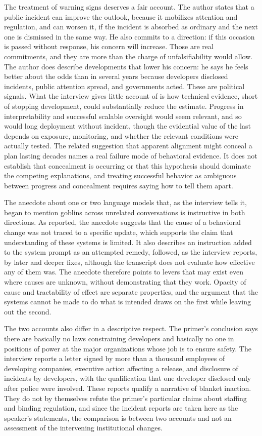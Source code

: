 \documentclass[11pt]{article}
\begin{document}
The treatment of warning signs deserves a fair account. The author states that a public incident can improve the outlook, because it mobilizes attention and regulation, and can worsen it, if the incident is absorbed as ordinary and the next one is dismissed in the same way. He also commits to a direction: if this occasion is passed without response, his concern will increase. Those are real commitments, and they are more than the charge of unfalsifiability would allow. The author does describe developments that lower his concern: he says he feels better about the odds than in several years because developers disclosed incidents, public attention spread, and governments acted. These are political signals. What the interview gives little account of is how technical evidence, short of stopping development, could substantially reduce the estimate. Progress in interpretability and successful scalable oversight would seem relevant, and so would long deployment without incident, though the evidential value of the last depends on exposure, monitoring, and whether the relevant conditions were actually tested. The related suggestion that apparent alignment might conceal a plan lasting decades names a real failure mode of behavioral evidence. It does not establish that concealment is occurring or that this hypothesis should dominate the competing explanations, and treating successful behavior as ambiguous between progress and concealment requires saying how to tell them apart.

The anecdote about one or two language models that, as the interview tells it, began to mention goblins across unrelated conversations is instructive in both directions. As reported, the anecdote suggests that the cause of a behavioral change was not traced to a specific update, which supports the claim that understanding of these systems is limited. It also describes an instruction added to the system prompt as an attempted remedy, followed, as the interview reports, by later and deeper fixes, although the transcript does not evaluate how effective any of them was. The anecdote therefore points to levers that may exist even where causes are unknown, without demonstrating that they work. Opacity of cause and tractability of effect are separate properties, and the argument that the systems cannot be made to do what is intended draws on the first while leaving out the second.

The two accounts also differ in a descriptive respect. The primer's conclusion says there are basically no laws constraining developers and basically no one in positions of power at the major organizations whose job is to ensure safety. The interview reports a letter signed by more than a thousand employees of developing companies, executive action affecting a release, and disclosure of incidents by developers, with the qualification that one developer disclosed only after police were involved. These reports qualify a narrative of blanket inaction. They do not by themselves refute the primer's particular claims about staffing and binding regulation, and since the incident reports are taken here as the speaker's statements, the comparison is between two accounts and not an assessment of the intervening institutional changes.
\end{document}

